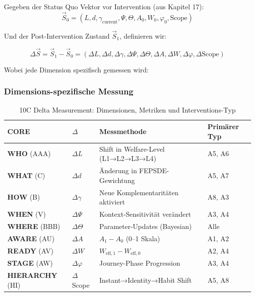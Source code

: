 \begin{tcolorbox}[colback=purple!5!white, colframe=purple!75!black,
    title=\textbf{Definition: 10C Delta Measurement}]

Gegeben der Status Quo Vektor vor Intervention (aus Kapitel 17):
\begin{equation}
\vec{S}_0 = (L, d, \gamma_{\text{current}}, \Psi, \Theta, A_0, W_0, \varphi_0, \text{Scope})
\end{equation}

Und der Post-Intervention Zustand $\vec{S}_1$, definieren wir:

\begin{equation}
\boxed{\Delta\vec{S} = \vec{S}_1 - \vec{S}_0 = (\Delta L, \Delta d, \Delta\gamma, \Delta\Psi, \Delta\Theta, \Delta A, \Delta W, \Delta\varphi, \Delta\text{Scope})}
\end{equation}

Wobei jede Dimension spezifisch gemessen wird:
\end{tcolorbox}

\subsubsection{Dimensions-spezifische Messung}

\begin{table}[htbp]
\centering
\caption{10C Delta Measurement: Dimensionen, Metriken und Interventions-Typ}
\label{tab:20-9c-delta-measurement}
\renewcommand{\arraystretch}{1.4}
\footnotesize
\begin{tabular}{@{}llp{4.5cm}l@{}}
\toprule
\textbf{CORE} & \textbf{$\Delta$} & \textbf{Messmethode} & \textbf{Primärer Typ} \\
\midrule
\textbf{WHO} (AAA) & $\Delta L$ & Shift in Welfare-Level (L1→L2→L3→L4) & A5, A6 \\
\textbf{WHAT} (C) & $\Delta d$ & Änderung in FEPSDE-Gewichtung & A5, A7 \\
\textbf{HOW} (B) & $\Delta\gamma$ & Neue Komplementaritäten aktiviert & A8, A3 \\
\textbf{WHEN} (V) & $\Delta\Psi$ & Kontext-Sensitivität verändert & A3, A4 \\
\textbf{WHERE} (BBB) & $\Delta\Theta$ & Parameter-Updates (Bayesian) & Alle \\
\textbf{AWARE} (AU) & $\Delta A$ & $A_1 - A_0$ (0--1 Skala) & A1, A2 \\
\textbf{READY} (AV) & $\Delta W$ & $W_{\text{eff},1} - W_{\text{eff},0}$ & A2, A4 \\
\textbf{STAGE} (AW) & $\Delta\varphi$ & Journey-Phase Progression & A3, A4 \\
\textbf{HIERARCHY} (HI) & $\Delta$Scope & Instant→Identity→Habit Shift & A5, A8 \\
\bottomrule
\end{tabular}
\end{table}

